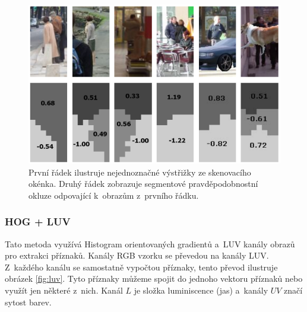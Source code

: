 \begin{figure}[H]
\centering
\includegraphics[width=.6\linewidth]{figures/hoglbp_obr}
\caption{ První řádek ilustruje nejednoznačné výstřižky ze skenovacího okénka. Druhý řádek zobrazuje segmentové pravděpodobnostní okluze odpovající k~obrazům z~prvního řádku.\cite{hoglpb}}
\label{fig:hoglbp}
\end{figure}

\subsubsection*{HOG + LUV}
Tato metoda využívá Histogram orientovaných gradientů a~LUV kanály obrazů pro extrakci příznaků. Kanály RGB vzorku se převedou na kanály LUV. Z~každého kanálu se samostatně vypočtou příznaky, tento převod ilustruje obrázek \ref{fig:luv}. Tyto příznaky můžeme spojit do jednoho vektoru příznaků nebo využít jen některé z~nich. Kanál $L$ je složka luminiscence (jas) a~kanály $UV$ značí sytost barev. 

